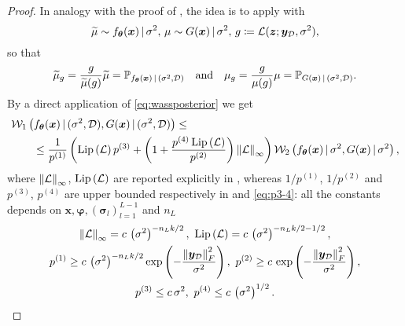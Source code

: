 \begin{proof}
	In analogy with the proof of , the idea is to apply  with
	\begin{equation*}
		\widetilde{\mu} \sim f_{\bm{\theta}}(\bm{x}) \given \sigma^2, \, \mu \sim G(\bm{x}) \given \sigma^2, \, g \coloneqq \mathcal{L}(\bm{z}; \bm{y}_{\mathcal{D}}, \sigma^2),
	\end{equation*}
	so that
	\begin{equation*}
		\widetilde{\mu}_g = \frac{g}{\widetilde{\mu}(g)} \widetilde{\mu} = \mathbb{P}_{f_{\bm{\theta}}(\bm{x}) \given (\sigma^2, \train)} \quad \text{and} \quad \mu_g = \frac{g}{\mu(g)} \mu = \mathbb{P}_{G(\bm{x}) \given (\sigma^2, \train)}.
	\end{equation*}
	By a direct application of \cref{eq:wassposterior} we get
	\begin{equation} \label{eq:nngpsigma1}
		\begin{aligned}
			& \wass[1]{f_{\bm{\theta}}(\bm{x}) \given (\sigma^2, \train)}{G(\bm{x}) \given (\sigma^2, \train)} \leq \\
			& \kern20pt \leq \frac{1}{p^{(1)}} \left(\lipschitz{\mathcal{L}} p^{(3)} + \left(1 + \frac{p^{(4)} \lipschitz{\mathcal{L}}}{p^{(2)}}\right) \norm{\mathcal{L}}_{\infty}\right) \wass[2]{f_{\bm{\theta}}(\bm{x}) \given \sigma^2}{G(\bm{x}) \given \sigma^2},
		\end{aligned}
	\end{equation}
	where $\norm{\mathcal{L}}_{\infty}$, $\lipschitz{\mathcal{L}}$ are reported explicitly in , whereas $1 / p^{(1)}$, $1 / p^{(2)}$ and $p^{(3)}$, $p^{(4)}$ are upper bounded respectively in  and \cref{eq:p3-4}: all the constants depends on $\bm{x}, \bm{\varphi}, (\bm{\sigma}_l)_{l = 1}^{L - 1}$ and $n_L$
	\begin{equation} \label{eq:p1-4final}
		\begin{gathered}
			\norm{\mathcal{L}}_{\infty} = c \, \left(\sigma^2\right)^{- n_L k / 2}, \ \lipschitz{\mathcal{L}} = c \, \left(\sigma^2\right)^{-n_L k / 2 - 1/2}, \\
			p^{(1)} \geq c \, \left(\sigma^2\right)^{- n_L k / 2} \exp{-\frac{\norm{\bm{y}_{\mathcal{D}}}_F^2}{\sigma^2}}, \ p^{(2)} \geq c \, \exp{-\frac{\norm{\bm{y}_{\mathcal{D}}}_F^2}{\sigma^2}}, \\
			p^{(3)} \leq c \, \sigma^2, \ p^{(4)} \leq c \, \left(\sigma^2\right)^{1/2}.
		\end{gathered}
	\end{equation}

\end{proof}
